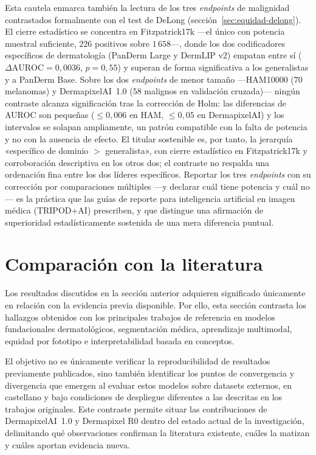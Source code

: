 Esta cautela enmarca también la lectura de los tres \emph{endpoints} de
malignidad contrastados formalmente con el test de DeLong
(sección~\ref{sec:equidad-delong}). El cierre estadístico se concentra
en Fitzpatrick17k ---el único con potencia muestral suficiente, $226$
positivos sobre $1\,658$---, donde los dos codificadores específicos de
dermatología (PanDerm Large y DermLIP v2) empatan entre sí
($\Delta\mathrm{AUROC} = 0{,}0036$, $p = 0{,}55$) y superan de forma
significativa a los generalistas y a PanDerm Base. Sobre los dos
\emph{endpoints} de menor tamaño ---HAM10000 ($70$ melanomas) y
DermapixelAI~1.0 ($58$ malignos en validación cruzada)--- ningún
contraste alcanza significación tras la corrección de Holm: las
diferencias de AUROC son pequeñas ($\leq 0{,}006$ en HAM,
$\leq 0{,}05$ en DermapixelAI) y los intervalos se solapan ampliamente,
un patrón compatible con la falta de potencia y no con la ausencia de
efecto. El titular sostenible es, por tanto, la jerarquía «específico de
dominio $>$ generalista», con cierre estadístico en Fitzpatrick17k y
corroboración descriptiva en los otros dos; el contraste no respalda una
ordenación fina entre los dos líderes específicos. Reportar los tres
\emph{endpoints} con su corrección por comparaciones múltiples ---y
declarar cuál tiene potencia y cuál no--- es la práctica que las guías
de reporte para inteligencia artificial en imagen médica (TRIPOD+AI)
prescriben, y que distingue una afirmación de superioridad
estadísticamente sostenida de una mera diferencia puntual.

\section{Comparación con la literatura}
\label{sec:lit}

Los resultados discutidos en la sección anterior adquieren significado
únicamente en relación con la evidencia previa disponible. Por ello, esta
sección contrasta los hallazgos obtenidos con los principales trabajos de
referencia en modelos fundacionales dermatológicos, segmentación médica,
aprendizaje multimodal, equidad por fototipo e interpretabilidad basada
en conceptos.

El objetivo no es únicamente verificar la reproducibilidad de resultados
previamente publicados, sino también identificar los puntos de
convergencia y divergencia que emergen al evaluar estos modelos sobre
datasets externos, en castellano y bajo condiciones de despliegue
diferentes a las descritas en los trabajos originales. Este contraste
permite situar las contribuciones de DermapixelAI~1.0 y Dermapixel R0
dentro del estado actual de la investigación, delimitando qué
observaciones confirman la literatura existente, cuáles la matizan y
cuáles aportan evidencia nueva.

